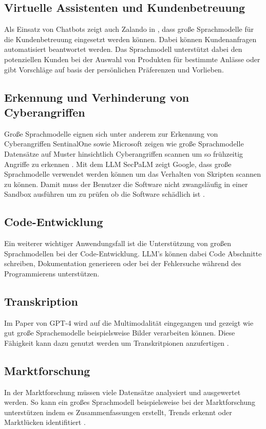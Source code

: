 \documentclass[conference]{IEEEtran}
\begin{document}
\subsection{Virtuelle Assistenten und Kundenbetreuung}
Als Einsatz von Chatbots zeigt auch Zalando in \cite{wuttkeLargeLanguageModel2023}, dass große Sprachmodelle für die Kundenbetreuung eingesetzt werden können. Dabei können Kundenanfragen automatisiert beantwortet werden. Das Sprachmodell unterstützt dabei den potenziellen Kunden bei der Auswahl von Produkten für bestimmte Anlässe oder gibt Vorschläge auf basis der persönlichen Präferenzen und Vorlieben.
\subsection{Erkennung und Verhinderung von Cyberangriffen}
Große Sprachmodelle eignen sich unter anderem zur Erkennung von Cyberangriffen SentinalOne sowie Microsoft zeigen wie große Sprachmodelle Datensätze auf Muster hinsichtlich Cyberangriffen scannen um so frühzeitig Angriffe zu erkennen \cite{MicrosoftCopilotSecurity}\cite{SentinelOneUnveilsRevolutionary}.
Mit dem LLM SecPaLM zeigt Google, dass große Sprachmodelle verwendet werden können um das Verhalten von Skripten scannen zu können. Damit muss der Benutzer die Software nicht zwangsläufig in einer Sandbox ausführen um zu prüfen ob die Software schädlich ist \cite{keary12PraktischeLarge2023}.
\subsection{Code-Entwicklung}
Ein weiterer wichtiger Anwendungsfall ist die Unterstützung von großen Sprachmodellen bei der Code-Entwicklung. LLM's können dabei Code Abschnitte schreiben, Dokumentation generieren oder bei der Fehlersuche während des Programmierens unterstützen. \cite{keary12PraktischeLarge2023}
\subsection{Transkription}
Im Paper von GPT-4 \cite{openaiGPT4TechnicalReport2024} wird auf die Multimodalität eingegangen und gezeigt wie gut große Sprachemodelle beispielsweise Bilder verarbeiten können. Diese Fähigkeit kann dazu genutzt werden um Transkritpionen anzufertigen \cite{keary12PraktischeLarge2023}.
\subsection{Marktforschung}
In der Marktforschung müssen viele Datensätze analysiert und ausgewertet werden. So kann ein großes Sprachmodell beispielsweise bei der Marktforschung unterstützen indem es Zusammenfassungen erstellt, Trends erkennt oder Marktlücken identifitiert \cite{keary12PraktischeLarge2023}.
\end{document}
